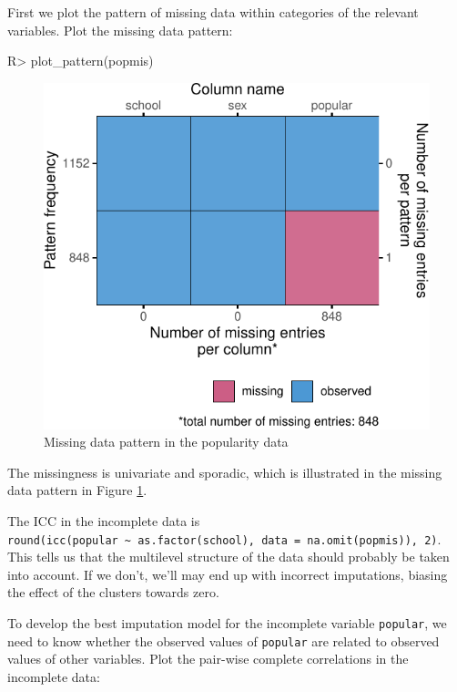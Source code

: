 \documentclass[
]{jss}
\begin{document}
First we plot the pattern of missing data within categories of the
relevant variables. Plot the missing data pattern:

\begin{CodeChunk}
\begin{CodeInput}
R> plot_pattern(popmis)
\end{CodeInput}
\begin{figure}

{\centering \includegraphics{Imputation_of_Incomplete_Multilevel_Data_files/figure-latex/pop_pat-1} 

}

\caption[Missing data pattern in the popularity data]{Missing data pattern in the popularity data}\label{fig:pop_pat}
\end{figure}
\end{CodeChunk}

The missingness is univariate and sporadic, which is illustrated in the
missing data pattern in Figure \ref{fig:pop_pat}.

The ICC in the incomplete data is
\texttt{round(icc(popular\ \textasciitilde{}\ as.factor(school),\ data\ =\ na.omit(popmis)),\ 2)}.
This tells us that the multilevel structure of the data should probably
be taken into account. If we don't, we'll may end up with incorrect
imputations, biasing the effect of the clusters towards zero.

To develop the best imputation model for the incomplete variable
\texttt{popular}, we need to know whether the observed values of
\texttt{popular} are related to observed values of other variables. Plot
the pair-wise complete correlations in the incomplete data:
\end{document}

